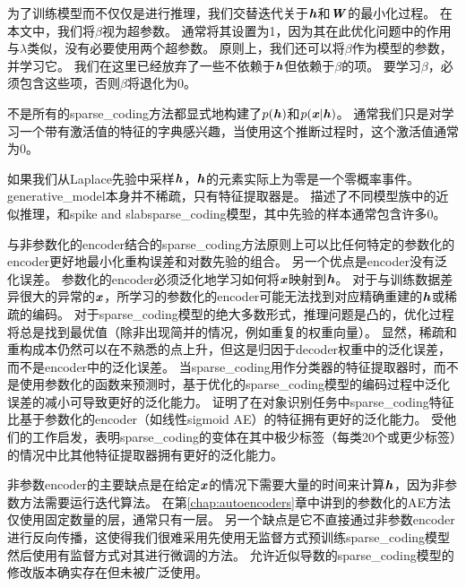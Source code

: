 为了训练模型而不仅仅是进行推理，我们交替迭代关于$\boldsymbol{\mathit{h}}$和$\boldsymbol{\mathit{W}}$的最小化过程。
在本文中，我们将$\beta$视为超参数。
通常将其设置为1，因为其在此优化问题中的作用与$\lambda$类似，没有必要使用两个超参数。 
原则上，我们还可以将$\beta$作为模型的参数，并学习它。
我们在这里已经放弃了一些不依赖于$\boldsymbol{\mathit{h}}$但依赖于$\beta$的项。
要学习$\beta$，必须包含这些项，否则$\beta$将退化为0。



不是所有的\gls{sparse_coding}方法都显式地构建了$p(\boldsymbol{\mathit{h}})$和$p(\boldsymbol{\mathit{x}}\vert\boldsymbol{\mathit{h}})$。 
通常我们只是对学习一个带有激活值的特征的字典感兴趣，当使用这个推断过程时，这个激活值通常为0。

如果我们从Laplace先验中采样$\boldsymbol{\mathit{h}}$，$\boldsymbol{\mathit{h}}$的元素实际上为零是一个零概率事件。
\gls{generative_model}本身并不稀疏，只有特征提取器是。
\citet{Goodfeli-et-al-TPAMI-Deep-PrePrint-2013-small}描述了不同模型族中的近似推理，和spike and slab\gls{sparse_coding}模型，其中先验的样本通常包含许多0。

与非参数化的\gls{encoder}结合的\gls{sparse_coding}方法原则上可以比任何特定的参数化的\gls{encoder}更好地最小化重构误差和对数先验的组合。
另一个优点是\gls{encoder}没有泛化误差。
参数化的\gls{encoder}必须泛化地学习如何将$\boldsymbol{\mathit{x}}$映射到$\boldsymbol{\mathit{h}}$。
对于与训练数据差异很大的异常的$\boldsymbol{\mathit{x}}$，所学习的参数化的\gls{encoder}可能无法找到对应精确重建的$\boldsymbol{\mathit{h}}$或稀疏的编码。
对于\gls{sparse_coding}模型的绝大多数形式，推理问题是凸的，优化过程将总是找到最优值（除非出现简并的情况，例如重复的权重向量）。
显然，稀疏和重构成本仍然可以在不熟悉的点上升，但这是归因于\gls{decoder}权重中的泛化误差，而不是\gls{encoder}中的泛化误差。
当\gls{sparse_coding}用作分类器的特征提取器时，而不是使用参数化的函数来预测时，基于优化的\gls{sparse_coding}模型的编码过程中泛化误差的减小可导致更好的泛化能力。
\citet{Coates2011b}证明了在对象识别任务中\gls{sparse_coding}特征比基于参数化的\gls{encoder}（如线性sigmoid \gls{AE}）的特征拥有更好的泛化能力。
受他们的工作启发，\citet{Goodfeli-et-al-TPAMI-Deep-PrePrint-2013-small}表明\gls{sparse_coding}的变体在其中极少标签（每类20个或更少标签）的情况中比其他特征提取器拥有更好的泛化能力。



非参数\gls{encoder}的主要缺点是在给定$\boldsymbol{\mathit{x}}$的情况下需要大量的时间来计算$\boldsymbol{\mathit{h}}$，因为非参数方法需要运行迭代算法。
在第\ref{chap:autoencoders}章中讲到的参数化的\gls{AE}方法仅使用固定数量的层，通常只有一层。
另一个缺点是它不直接通过非参数\gls{encoder}进行反向传播，这使得我们很难采用先使用无监督方式预训练\gls{sparse_coding}模型然后使用有监督方式对其进行微调的方法。
允许近似导数的\gls{sparse_coding}模型的修改版本确实存在但未被广泛使用\citep{Bradley+Bagnell-2009-small}。

